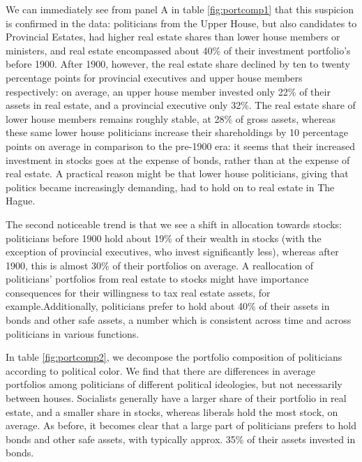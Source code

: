     We can immediately see from panel A in table \ref{fig:portcomp1} that this suspicion is confirmed in the data: politicians from the Upper House, but also candidates to Provincial Estates, had higher real estate shares than lower house members or ministers, and real estate encompassed about 40\% of their investment portfolio's before 1900. After 1900, however, the real estate share declined by ten to twenty percentage points for provincial executives and upper house members respectively: on average, an upper house member invested only 22\% of their assets in real estate, and a provincial executive only 32\%. The real estate share of lower house members remains roughly stable, at 28\% of gross assets, whereas these same lower house politicians increase their shareholdings by 10 percentage points on average in comparison to the pre-1900 era: it seems that their increased investment in stocks goes at the expense of bonds, rather than at the expense of real estate. A practical reason might be that lower house politicians, giving that politics became increasingly demanding, had to hold on to real estate in The Hague.
    
    The second noticeable trend is that we see a shift in allocation towards stocks: politicians before 1900 hold about 19\% of their wealth in stocks (with the exception of provincial executives, who invest significantly less), whereas after 1900, this is almost 30\% of their portfolios on average. A reallocation of politicians' portfolios from real estate to stocks might have importance consequences for their willingness to tax real estate assets, for example.Additionally, politicians prefer to hold about 40\% of their assets in bonds and other safe assets, a number which is consistent across time and across politicians in various functions. 
    
    In table \ref{fig:portcomp2}, we decompose the portfolio composition of politicians according to political color. We find that there are differences in average portfolios among politicians of different political ideologies, but not necessarily between houses. Socialists generally have a larger share of their portfolio in real estate, and a smaller share in stocks, whereas liberals hold the most stock, on average. As before, it becomes clear that a large part of politicians prefers to hold bonds and other safe assets, with typically approx. 35\% of their assets invested in bonds. 
    
